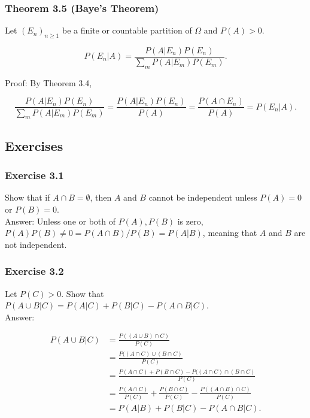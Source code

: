 \documentclass{article}
\begin{document}
{\subsubsection*{Theorem 3.5 (Baye's Theorem)} Let $(E_n)_{n\geq 1}$ be a finite or countable partition of $\Omega$ and $P(A) > 0$.

$$
P(E_n \vert A) = \frac{P(A \vert E_n)P(E_n)}{\sum_m P(A \vert E_m) P(E_m)}.
$$

Proof: By Theorem 3.4,

$$
\frac{P(A \vert E_n)P(E_n)}{\sum_m P(A \vert E_m) P(E_m)}
= \frac{P(A \vert E_n)P(E_n)}{P(A)}
= \frac{P(A \cap E_n)}{P(A)}
= P(E_n \vert A).
$$


\subsection*{Exercises}

\subsubsection*{Exercise 3.1}

Show that if $A \cap B = \emptyset$, then $A$ and $B$ cannot be independent unless $P(A) = 0$ or $P(B) = 0$. \\

Answer: Unless one or both of $P(A), P(B)$ is zero, $P(A)P(B) \neq 0 = P(A\cap B) / P(B) = P(A \vert B)$, meaning that $A$ and $B$ are not independent.

\subsubsection*{Exercise 3.2} Let $P(C) > 0$. Show that $P(A \cup B \vert C) = P(A \vert C) + P(B \vert C) - P(A \cap B \vert C)$. \\

Answer:

\begin{align*}
P(A\cup B \vert C) &= \frac{P((A\cup B) \cap C)}{P(C)} \\
&= \frac{P((A\cap C) \cup (B \cap C)}{P(C)} \\
&= \frac{P(A \cap C) + P(B \cap C) - P((A\cap C) \cap (B \cap C)}{P(C)} \\
&= \frac{P(A\cap C)}{P(C)} + \frac{P(B\cap C)}{P(C)} - \frac{P((A\cap B) \cap C)}{P(C)} \\
&= P(A \vert B) + P(B \vert C) - P(A\cap B \vert C).
\end{align*}

}
\end{document}
